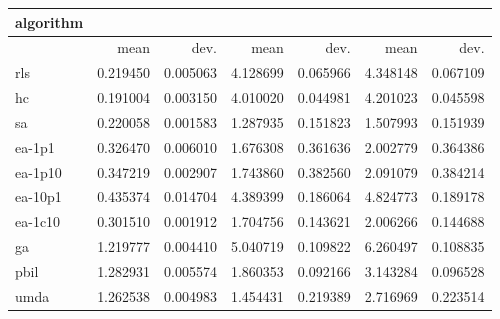 \begin{tabular}{@{}l*{6}{>{{}}N{1}{2}}@{}}
\toprule
{algorithm} &  &  &  \\
\midrule
& {mean} & {dev.} & {mean} & {dev.} & {mean} & {dev.} \\
\midrule
rls & 0.219450 & 0.005063 & 4.128699 & 0.065966 & 4.348148 & 0.067109 \\
 hc & 0.191004 & 0.003150 & 4.010020 & 0.044981 & 4.201023 & 0.045598 \\
 sa & 0.220058 & 0.001583 & 1.287935 & 0.151823 & 1.507993 & 0.151939 \\
 ea-1p1 & 0.326470 & 0.006010 & 1.676308 & 0.361636 & 2.002779 & 0.364386 \\
 ea-1p10 & 0.347219 & 0.002907 & 1.743860 & 0.382560 & 2.091079 & 0.384214 \\
 ea-10p1 & 0.435374 & 0.014704 & 4.389399 & 0.186064 & 4.824773 & 0.189178 \\
 ea-1c10 & 0.301510 & 0.001912 & 1.704756 & 0.143621 & 2.006266 & 0.144688 \\
 ga & 1.219777 & 0.004410 & 5.040719 & 0.109822 & 6.260497 & 0.108835 \\
 pbil & 1.282931 & 0.005574 & 1.860353 & 0.092166 & 3.143284 & 0.096528 \\
 umda & 1.262538 & 0.004983 & 1.454431 & 0.219389 & 2.716969 & 0.223514 \\
 \bottomrule
\end{tabular}
